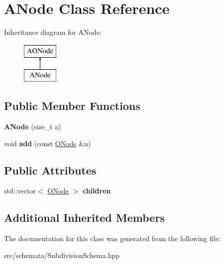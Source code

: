 \hypertarget{classANode}{}\section{A\+Node Class Reference}
\label{classANode}
Inheritance diagram for A\+Node\+:\begin{figure}[H]
\begin{center}
\leavevmode
\includegraphics[height=2.000000cm]{classANode}
\end{center}
\end{figure}
\subsection*{Public Member Functions}
\begin{DoxyCompactItemize}
\item 
\mbox{\label{classANode_ad96635728c3142bf0eef8f13a6bde1b9}} 
{\bfseries A\+Node} (size\+\_\+t a)
\item 
\mbox{\label{classANode_a392728d45708f36056cfaecd0de40a99}} 
void {\bfseries add} (const \mbox{\hyperlink{classONode}{O\+Node}} \&n)
\end{DoxyCompactItemize}
\subsection*{Public Attributes}
\begin{DoxyCompactItemize}
\item 
\mbox{\label{classANode_a3865adc88fbdec94e78d31935916f80b}} 
std\+::vector$<$ \mbox{\hyperlink{classONode}{O\+Node}} $>$ {\bfseries children}
\end{DoxyCompactItemize}
\subsection*{Additional Inherited Members}


The documentation for this class was generated from the following file\+:\begin{DoxyCompactItemize}
\item 
src/schemata/Subdivision\+Schema.\+hpp\end{DoxyCompactItemize}
